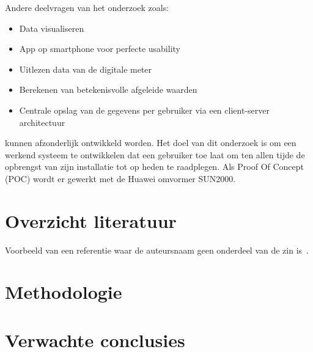 \documentclass{hogent-article}
\begin{document}
    Andere deelvragen van het onderzoek zoals:
    \begin{itemize}
        \item Data visualiseren
        \item App op smartphone voor perfecte usability
        \item Uitlezen data van de digitale meter
        \item Berekenen van betekenisvolle afgeleide waarden
        \item Centrale opslag van de gegevens per gebruiker via een client-server architectuur
    \end{itemize}
    kunnen afzonderlijk ontwikkeld worden.
    Het doel van dit onderzoek is om een werkend systeem te ontwikkelen dat een gebruiker toe laat om ten allen tijde de opbrengst van zijn installatie tot op heden te raadplegen. Als Proof Of Concept (POC) wordt er gewerkt met de Huawei omvormer SUN2000.
    \lipsum[1-3]
    
    \section{Overzicht literatuur}
    
    
    Voorbeeld van een referentie waar de auteursnaam geen onderdeel van de zin is~\autocite{Moore2002}.
    
    \lipsum[4-9]
    
    \section{Methodologie}
    
    
    \lipsum[10-12]
    
    \section{Verwachte conclusies}
    
\end{document}
